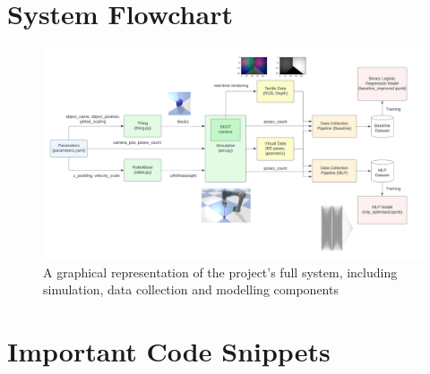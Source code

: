 \documentclass[11pt, a4paper]{report}
\begin{document}
 

\appendix
\printbibliography

\chapter{System Flowchart}\label{apdx:1}
\begin{figure}[H]
    \centering
    \includegraphics[width=\textwidth]{docs/Project Report/Media/appendix_project_architecture.png}
    \caption{A graphical representation of the project's full system, including simulation, data collection and modelling components}
    \label{fig:apdx1}
\end{figure}

\chapter{Important Code Snippets}\label{apdx:2}
\end{document}
